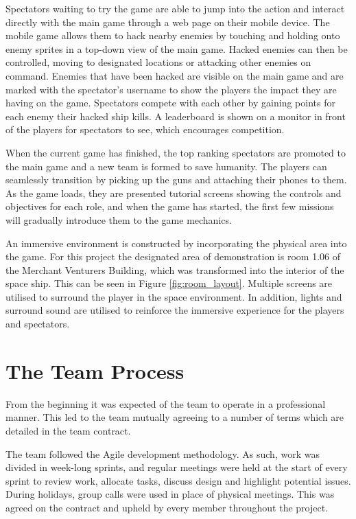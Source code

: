 \documentclass[a4paper,11pt]{article}
\begin{document}
Spectators waiting to try the game are able to jump into the action and interact directly with the main game through a web page on their mobile device. The mobile game allows them to hack nearby enemies by touching and holding onto enemy sprites in a top-down view of the main game. Hacked enemies can then be controlled, moving to designated locations or attacking other enemies on command. Enemies that have been hacked are visible on the main game and are marked with the spectator’s username to show the players the impact they are having on the game. Spectators compete with each other by gaining points for each enemy their hacked ship kills. A leaderboard is shown on a monitor in front of the players for spectators to see, which encourages competition. 

When the current game has finished, the top ranking spectators are promoted to the main game and a new team is formed to save humanity. The players can seamlessly transition by picking up the guns and attaching their phones to them. As the game loads, they are presented tutorial screens showing the controls and objectives for each role, and when the game has started, the first few missions will gradually introduce them to the game mechanics.

An immersive environment is constructed by incorporating the physical area into the game. For this project the designated area of demonstration is room 1.06 of the  Merchant Venturers Building, which was transformed into the interior of the space ship. This can be seen in Figure \ref{fig:room_layout}. Multiple screens are utilised to surround the player in the space environment. In addition, lights and surround sound are utilised to reinforce the immersive experience for the players and spectators. 

\section{The Team Process}

From the beginning it was expected of the team to operate in a professional manner. This led to the team mutually agreeing to a number of terms which are detailed in the team contract.

The team followed the Agile development methodology. As such, work was divided in week-long sprints, and regular meetings were held at the start of every sprint to review work, allocate tasks, discuss design and highlight potential issues. During holidays, group calls were used in place of physical meetings. This was agreed on the contract and upheld by every member throughout the project.
\end{document}
